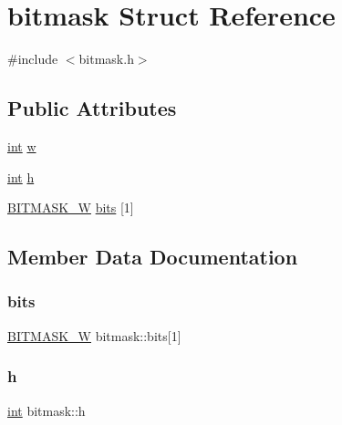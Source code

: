 \hypertarget{structbitmask}{}\section{bitmask Struct Reference}
\label{structbitmask}


{\ttfamily \#include $<$bitmask.\+h$>$}

\subsection*{Public Attributes}
\begin{DoxyCompactItemize}
\item 
\mbox{\hyperlink{warnings_8h_a74f207b5aa4ba51c3a2ad59b219a423b}{int}} \mbox{\hyperlink{structbitmask_a03e8844824a2221488952b5d8cb36fbc}{w}}
\item 
\mbox{\hyperlink{warnings_8h_a74f207b5aa4ba51c3a2ad59b219a423b}{int}} \mbox{\hyperlink{structbitmask_a381e9181479b66c7eddd1a2fb6c2f54c}{h}}
\item 
\mbox{\hyperlink{bitmask_8h_a65861bb1744fdd99af2c9d019c94c6a8}{B\+I\+T\+M\+A\+S\+K\+\_\+W}} \mbox{\hyperlink{structbitmask_a0f7afba30822975fc0d090e89254d1fe}{bits}} \mbox{[}1\mbox{]}
\end{DoxyCompactItemize}


\subsection{Member Data Documentation}
\mbox{\label{structbitmask_a0f7afba30822975fc0d090e89254d1fe}} 
\subsubsection{\texorpdfstring{bits}{bits}}
{\footnotesize\ttfamily \mbox{\hyperlink{bitmask_8h_a65861bb1744fdd99af2c9d019c94c6a8}{B\+I\+T\+M\+A\+S\+K\+\_\+W}} bitmask\+::bits\mbox{[}1\mbox{]}}

\mbox{\label{structbitmask_a381e9181479b66c7eddd1a2fb6c2f54c}} 
\subsubsection{\texorpdfstring{h}{h}}
{\footnotesize\ttfamily \mbox{\hyperlink{warnings_8h_a74f207b5aa4ba51c3a2ad59b219a423b}{int}} bitmask\+::h}

